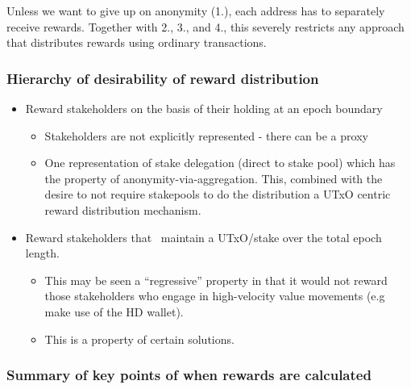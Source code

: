 \documentclass[11pt,a4paper]{article}
\begin{document}
Unless we want to give up on anonymity (1.), each address has to
separately receive rewards. Together with 2., 3., and 4., this severely
restricts any approach that distributes rewards using ordinary
transactions.

\subsubsection{Hierarchy of desirability of reward
distribution}\label{hierarchy-of-desirability-of-reward-distribution}

\begin{itemize}
\item
  Reward stakeholders on the basis of their holding at an epoch boundary

  \begin{itemize}
  \item
    Stakeholders are not explicitly represented - there can be a proxy
  \item
    One representation of stake delegation (direct to stake pool) which
    has the property of anonymity-via-aggregation. This, combined with
    the desire to not require stakepools to do the distribution a UTxO
    centric reward distribution mechanism.
  \end{itemize}
\item
  Reward stakeholders that ~maintain a UTxO/stake over the total epoch
  length.

  \begin{itemize}
  \item
    This may be seen a ``regressive'' property in that it would not
    reward those stakeholders who engage in high-velocity value
    movements (e.g make use of the HD wallet).
  \item
    This is a property of certain solutions.
  \end{itemize}
\end{itemize}

\subsubsection{Summary of key points of when rewards are
calculated}\label{summary-of-key-points-of-when-rewards-are-calculated}
\end{document}
